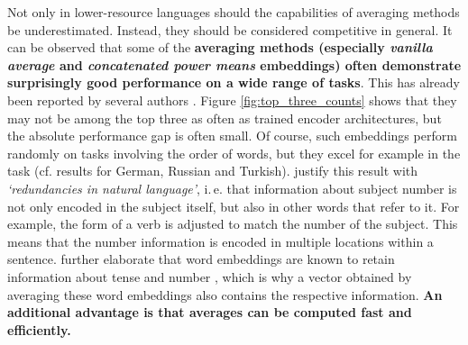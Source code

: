  Not only in lower-resource languages should the capabilities of averaging methods be underestimated. Instead, they should be considered competitive in general. It can be observed that some of the \textbf{averaging methods (especially  \textit{vanilla average} and \textit{concatenated power means} embeddings) often demonstrate surprisingly good performance on a wide range of tasks}. This has already been reported by several authors \citep[inter alia]{Arora.2017,Wieting.2016b}. Figure \vref{fig:top_three_counts} shows that they may not be among the top three as often as trained encoder architectures, but the absolute performance gap is often small. Of course, such embeddings perform randomly on tasks involving the order of words, but they excel for example in the  task (cf. results for German, Russian and Turkish). \citep{Conneau.2018a} justify this result with \textit{`redundancies in natural language'}, i.\,e. that information about subject number is not only encoded in the subject itself, but also in other words that refer to it. For example, the form of a verb is adjusted to match the number of the subject. This means that the number information is encoded in multiple locations within a sentence. \citep{Conneau.2018a} further elaborate that word embeddings are known to retain information about tense and number \citep{Mikolov.2013c}, which is why a vector obtained by averaging these word embeddings also contains the respective information. \textbf{An additional advantage is that averages can be computed fast and efficiently.}

